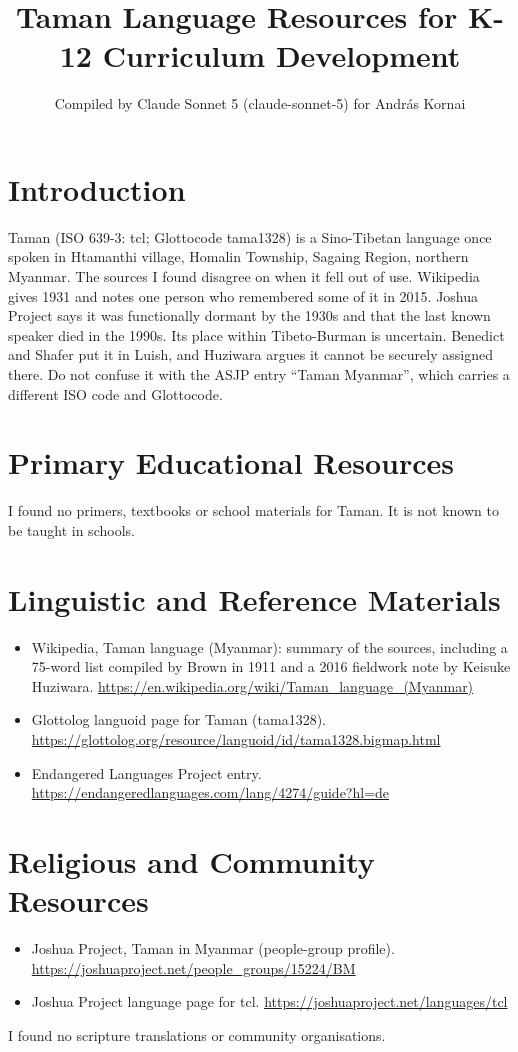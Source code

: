 \documentclass[12pt]{article}
\title{Taman Language Resources for K-12 Curriculum Development}
\author{Compiled by Claude Sonnet 5 (claude-sonnet-5) for Andr\'as Kornai}
\date{}
\begin{document}
\maketitle
\section{Introduction}
Taman (ISO 639-3: tcl; Glottocode tama1328) is a Sino-Tibetan language once spoken in Htamanthi village, Homalin Township, Sagaing Region, northern Myanmar. The sources I found disagree on when it fell out of use. Wikipedia gives 1931 and notes one person who remembered some of it in 2015. Joshua Project says it was functionally dormant by the 1930s and that the last known speaker died in the 1990s. Its place within Tibeto-Burman is uncertain. Benedict and Shafer put it in Luish, and Huziwara argues it cannot be securely assigned there. Do not confuse it with the ASJP entry ``Taman Myanmar'', which carries a different ISO code and Glottocode.
\section{Primary Educational Resources}
I found no primers, textbooks or school materials for Taman. It is not known to be taught in schools.
\section{Linguistic and Reference Materials}
\begin{itemize}
\item Wikipedia, Taman language (Myanmar): summary of the sources, including a 75-word list compiled by Brown in 1911 and a 2016 fieldwork note by Keisuke Huziwara. \url{https://en.wikipedia.org/wiki/Taman_language_(Myanmar)}
\item Glottolog languoid page for Taman (tama1328). \url{https://glottolog.org/resource/languoid/id/tama1328.bigmap.html}
\item Endangered Languages Project entry. \url{https://endangeredlanguages.com/lang/4274/guide?hl=de}
\end{itemize}
\section{Religious and Community Resources}
\begin{itemize}
\item Joshua Project, Taman in Myanmar (people-group profile). \url{https://joshuaproject.net/people_groups/15224/BM}
\item Joshua Project language page for tcl. \url{https://joshuaproject.net/languages/tcl}
\end{itemize}
I found no scripture translations or community organisations.
\end{document}
